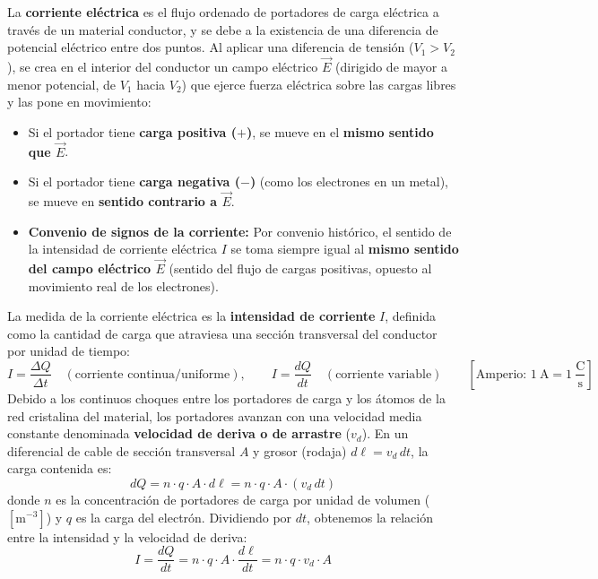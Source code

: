 La \textbf{corriente eléctrica} es el flujo ordenado de portadores de carga eléctrica a través de un material conductor, y se debe a la existencia de una diferencia de potencial eléctrico entre dos puntos. Al aplicar una diferencia de tensión ($V_1 > V_2$), se crea en el interior del conductor un campo eléctrico $\vec{E}$ (dirigido de mayor a menor potencial, de $V_1$ hacia $V_2$) que ejerce fuerza eléctrica sobre las cargas libres y las pone en movimiento:
\begin{itemize}[leftmargin=*]
    \item Si el portador tiene \textbf{carga positiva ($+$)}, se mueve en el \textbf{mismo sentido que $\vec{E}$}.
    \item Si el portador tiene \textbf{carga negativa ($-$)} (como los electrones en un metal), se mueve en \textbf{sentido contrario a $\vec{E}$}.
    \item \textbf{Convenio de signos de la corriente:} Por convenio histórico, el sentido de la intensidad de corriente eléctrica $I$ se toma siempre igual al \textbf{mismo sentido del campo eléctrico $\vec{E}$} (sentido del flujo de cargas positivas, opuesto al movimiento real de los electrones).
\end{itemize}

\begin{definicion}
La medida de la corriente eléctrica es la \textbf{intensidad de corriente} $I$, definida como la cantidad de carga que atraviesa una sección transversal del conductor por unidad de tiempo:
\begin{equation}
    I = \frac{\Delta Q}{\Delta t}\quad (\text{corriente continua/uniforme}), \qquad I = \frac{dQ}{dt}\quad (\text{corriente variable}) \qquad \left[\text{Amperio: } 1\ \si{\ampere} = 1\ \frac{\si{\coulomb}}{\si{\second}}\right]
\end{equation}
Debido a los continuos choques entre los portadores de carga y los átomos de la red cristalina del material, los portadores avanzan con una velocidad media constante denominada \textbf{velocidad de deriva o de arrastre} ($v_d$). En un diferencial de cable de sección transversal $A$ y grosor (rodaja) $d\ell = v_d\, dt$, la carga contenida es:
\begin{equation}
    dQ = n \cdot q \cdot A \cdot d\ell = n \cdot q \cdot A \cdot (v_d\, dt)
\end{equation}
donde $n$ es la concentración de portadores de carga por unidad de volumen ($[\si{\meter^{-3}}]$) y $q$ es la carga del electrón. Dividiendo por $dt$, obtenemos la relación entre la intensidad y la velocidad de deriva:
\begin{equation}
    \boxed{I = \frac{dQ}{dt} = n \cdot q \cdot A \cdot \frac{d\ell}{dt} = n \cdot q \cdot v_d \cdot A}
\end{equation}
\end{definicion}

